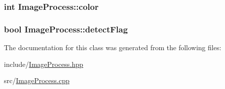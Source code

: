 \subsubsection[{\texorpdfstring{color}{color}}]{\setlength{\rightskip}{0pt plus 5cm}int Image\+Process\+::color}\hypertarget{classImageProcess_ab96f8c1ee03f6bbf8e60ffa496fdaa0d}{}\label{classImageProcess_ab96f8c1ee03f6bbf8e60ffa496fdaa0d}
\subsubsection[{\texorpdfstring{detect\+Flag}{detectFlag}}]{\setlength{\rightskip}{0pt plus 5cm}bool Image\+Process\+::detect\+Flag}\hypertarget{classImageProcess_a265b78fb51ab67a89743dd9c3f85e69b}{}\label{classImageProcess_a265b78fb51ab67a89743dd9c3f85e69b}


The documentation for this class was generated from the following files\+:\begin{DoxyCompactItemize}
\item 
include/\hyperlink{ImageProcess_8hpp}{Image\+Process.\+hpp}\item 
src/\hyperlink{ImageProcess_8cpp}{Image\+Process.\+cpp}\end{DoxyCompactItemize}
